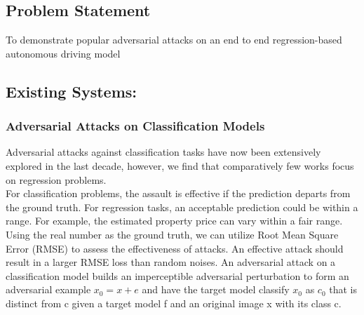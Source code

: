 \documentclass[ 12pt,a4paper,twocolumn,fleqn]{article}
\begin{document}
\subsection{Problem Statement}
To demonstrate popular adversarial attacks on an end to end regression-based autonomous driving model\\
\subsection{Existing Systems:}
\subsubsection{Adversarial Attacks on Classification Models}
Adversarial attacks against classification tasks have now been extensively explored in the last decade, however, we find that comparatively few works focus on regression problems.\\
%
For classification problems, the assault is effective if the prediction departs from the ground truth. For regression tasks, an acceptable prediction could be within a range. For example, the estimated property price can vary within a fair range. Using the real number as the ground truth, we can utilize Root Mean Square Error (RMSE) to assess the effectiveness of attacks. An effective attack should result in a larger RMSE loss than random noises. An adversarial attack on a classification model builds an imperceptible adversarial perturbation to form an adversarial example $x_{0} = x + e$ and have the target model classify $x_{0}$ as $c_{0}$ that is distinct from c given a target model f and an original image x with its class c.\\
\end{document}
